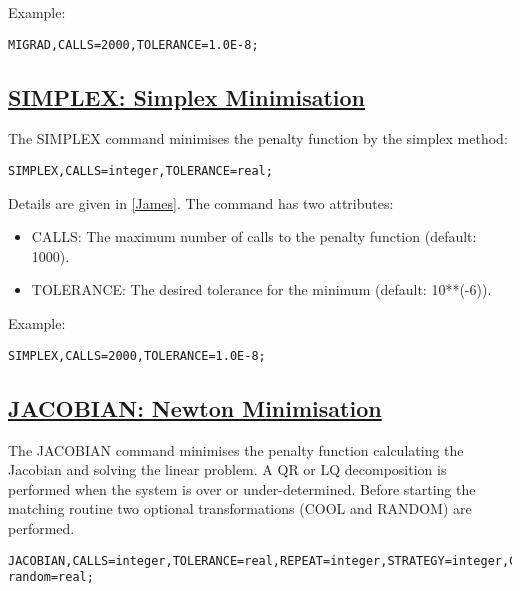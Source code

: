 Example: 
\begin{verbatim}
MIGRAD,CALLS=2000,TOLERANCE=1.0E-8;
\end{verbatim}

\subsection{\href{simplex}{SIMPLEX: Simplex Minimisation}}

The SIMPLEX command minimises the penalty function by the simplex method: 

\begin{verbatim}
SIMPLEX,CALLS=integer,TOLERANCE=real;
\end{verbatim}

Details are given in \href{bibliography.html#minuit}{[James]}. The command has two attributes: 
\begin{itemize}
	\item CALLS: The maximum number of calls to the penalty function (default: 1000). 
	\item TOLERANCE: The desired tolerance for the minimum (default: 10**(-6)). 
\end{itemize} 

Example: 
\begin{verbatim}
SIMPLEX,CALLS=2000,TOLERANCE=1.0E-8;
\end{verbatim}

\subsection{\href{jacobian}{JACOBIAN: Newton Minimisation}}
The JACOBIAN command minimises the penalty function calculating the Jacobian and solving the linear problem. A QR or LQ  decomposition is performed when the system is over or under-determined. Before starting the matching routine two optional transformations (COOL and RANDOM) are performed.     

\begin{verbatim}
JACOBIAN,CALLS=integer,TOLERANCE=real,REPEAT=integer,STRATEGY=integer,COOL=real,BALANCE=real, random=real;
\end{verbatim}

